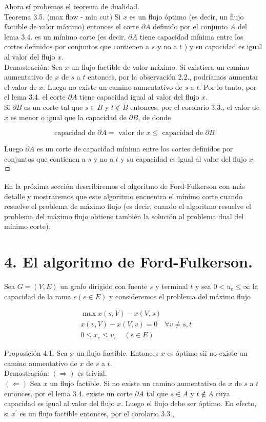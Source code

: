 \documentclass[10pt]{article}
\begin{document}
Ahora sí probemos el teorema de dualidad.\\
Teorema 3.5. (max flow - min cut) Si $x$ es un flujo óptimo (es decir, un flujo factible de valor máximo) entonces el corte $\partial A$ definido por el conjunto $A$ del lema 3.4. es un mínimo corte (es decir, $\partial A$ tiene capacidad mínima entre los cortes definidos por conjuntos que contienen a $s$ y no a $t$ ) y su capacidad es igual al valor del flujo $x$.\\
Demostración: Sea $x$ un flujo factible de valor máximo. Si existiera un camino aumentativo de $x$ de $s$ a $t$ entonces, por la observación 2.2., podríamos aumentar el valor de $x$. Luego no existe un camino aumentativo de $s$ a $t$. Por lo tanto, por el lema 3.4. el corte $\partial A$ tiene capacidad igual al valor del flujo $x$.\\
Si $\partial B$ es un corte tal que $s \in B$ y $t \notin B$ entonces, por el corolario 3.3., el valor de $x$ es menor o igual que la capacidad de $\partial B$, de donde

$$
\text { capacidad de } \partial A=\text { valor de } x \leq \text { capacidad de } \partial B
$$

Luego $\partial A$ es un corte de capacidad mínima entre los cortes definidos por conjuntos que contienen a $s$ y no a $t$ y su capacidad es igual al valor del flujo $x$. ㅁ

En la próxima sección describiremos el algoritmo de Ford-Fulkerson con más detalle y mostraremos que este algoritmo encuentra el mínimo corte cuando resuelve el problema de máximo flujo (es decir, cuando el algoritmo resuelve el problema del máximo flujo obtiene también la solución al problema dual del mínimo corte).

\section*{4. El algoritmo de Ford-Fulkerson.}
Sea $G=(V, E)$ un grafo dirigido con fuente $s$ y terminal $t$ y sea $0<u_{e} \leq \infty$ la capacidad de la rama $e (e \in E)$ y consideremos el problema del máximo flujo

$$
\begin{aligned}
& \max x(s, V)-x(V, s) \\
& x(v, V)-x(V, v)=0 \quad \forall v \neq s, t \\
& 0 \leq x_{e} \leq u_{e} \quad(e \in E)
\end{aligned}
$$

Proposición 4.1. Sea $x$ un flujo factible. Entonces $x$ es óptimo sii no existe un camino aumentativo de $x$ de $s$ a $t$.\\
Demostración: $(\Longrightarrow)$ es trivial.\\
$(\Longleftarrow)$ Sea $x$ un flujo factible. Si no existe un camino aumentativo de $x$ de $s$ a $t$ entonces, por el lema 3.4. existe un corte $\partial A$ tal que $s \in A$ y $t \notin A$ cuya capacidad es igual al valor del flujo $x$. Luego el flujo debe ser óptimo. En efecto, si $x^{\prime}$ es un flujo factible entonces, por el corolario 3.3.,
\end{document}
